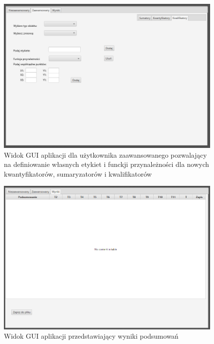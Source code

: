 \documentclass{classrep}
\begin{document}
  \begin{figure}[H]
    \centering
    \includegraphics[scale = 0.5]{gui2}
    \caption{Widok GUI aplikacji dla użytkownika zaawansowanego pozwalający na definiowanie własnych etykiet i funckji przynależności dla nowych kwantyfikatorów, sumaryzatorów i kwalifikatorów}
  \end{figure}
  
  \begin{figure}[H]
    \centering
    \includegraphics[scale = 0.5]{gui3}
    \caption{Widok GUI aplikacji przedstawiający wyniki podsumowań}
  \end{figure}


\end{document}
